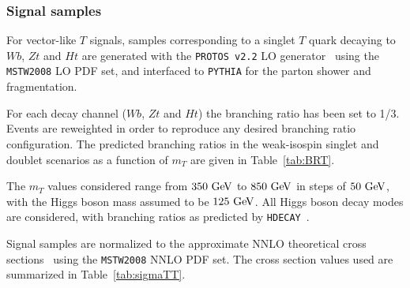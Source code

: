 \subsubsection{Signal samples}\label{subsec:MCsignal}

For vector-like $T$ signals, samples corresponding to a singlet $T$ quark 
decaying to $Wb$, $Zt$ and $Ht$ are generated with the {\tt PROTOS v2.2} 
LO generator~\cite{jaas,protos} 
using the  {\tt MSTW2008} LO PDF set, and interfaced to {\tt PYTHIA} for 
the parton shower and fragmentation. 

For each decay channel ($Wb$, $Zt$ and $Ht$) the branching ratio has been 
set to 1/3. Events are reweighted
in order to reproduce any desired branching ratio configuration. 
The predicted branching ratios in the weak-isospin singlet and doublet scenarios as 
a function of $m_{T}$ are given in Table~\ref{tab:BRT}.

The $m_{T}$ values considered range from $350\gev$ to $850\gev$ in steps of $50\gev$, 
with the Higgs boson mass assumed 
to be $125\gev$. All Higgs boson decay modes are considered, 
with branching ratios as predicted by {\tt HDECAY}~\cite{hdecay}.

Signal samples are normalized to the approximate NNLO theoretical cross sections~\cite{ttbarxs} using the {\tt MSTW2008} NNLO PDF set.
The cross section values used are summarized in Table~\ref{tab:sigmaTT}.




